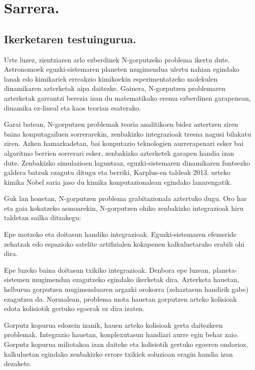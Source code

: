 \chapter{Sarrera.}


\section{Ikerketaren testuingurua.}

Urte luzez, zientziaren arlo ezberdinek N-gorputzeko problema ikertu dute. Astronomoek eguzki-sistemaren planeten mugimendua ulertu nahian egindako lanak edo kimikariek erreakzio kimikoekin esperimentatzeko molekulen dinamikaren azterketak aipa daitezke. Gainera,  N-gorputzen problemaren azterketak garrantzi berezia izan du matematikako eremu ezberdinen garapenean,  dinamika ez-lineal eta kaos teorian esaterako. 

Garai batean, N-gorputzen problemak teoria analitikoen bidez aztertzen ziren baina konputagailuen sorrerarekin, zenbakizko integrazioak tresna nagusi bilakatu ziren. Azken hamarkadetan, bai konputazio teknologien aurrerapenari esker bai algoritmo berrien sorrerari esker, zenbakizko azterketek garapen handia izan dute. Zenbakizko simulazioen laguntzaz, eguzki-sistemaren dinamikaren funtsezko galdera batzuk ezagutu ditugu eta berriki, Karplus-en taldeak 2013. urteko kimika Nobel saria \cite{Karplus2014} jaso du kimika konputazionalean egindako lanarengatik.       

Guk lan honetan, N-gorputzen problema grabitazionala aztertuko dugu. Oro har eta gaia kokatzeko asmoarekin, N-gorputzen ohiko zenbakizko  integrazioak hiru taldetan sailka ditzakegu:
\begin{enumerate}
{
\item Epe motzeko eta doitasun handiko integrazioak. 
 Eguzki-sistemaren efemeride zehatzak \cite{Folkner2014} edo espazioko satelite artifizialen kokapenen \cite{Beylkin2014} kalkuluetarako erabili ohi dira.
\item Epe luzeko baina doitasun txikiko integrazioak.
 Denbora epe luzean, planeta-sistemen mugimendua ezagutzeko egindako ikerketak dira. Azterketa hauetan, helburua gorputzen mugimenduaren argazki orokorra (zehaztasun handirik gabe) ezagutzea da. Normalean, problema mota hauetan gorputzen arteko kolisioak edota kolisiotik gertuko egoerak ez dira izaten.     
\item Gorputz kopurua edozein izanik, hauen arteko kolisioak gerta daitezkeen problemak.
 Integrazio hauetan, konplexutasun handiari aurre egin behar zaio. Gorputz kopurua miliotakoa \cite{Ishiyama2012} izan daiteke eta kolisiotik gertuko egoeren ondorioz, kalkuluetan egindako zenbakizko errore txikiek soluzioan eragin handia izan dezakete.    
}
\end{enumerate}

